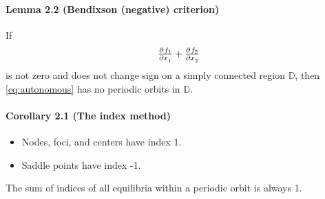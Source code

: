 \paragraph{Lemma 2.2 (Bendixson (negative) criterion)}
If
\begin{equation}
	\pd{f_1}{x_1} + \pd{f_2}{x_2}
\end{equation}
is not zero and does not change sign on a simply connected region $\mathbb{D}$, then \eqref{eq:autonomous} has no periodic orbits in $\mathbb{D}$.

\paragraph{Corollary 2.1 (The index method)}
\begin{itemize}
	\item Nodes, foci, and centers have index 1.
	\item Saddle points have index -1.
\end{itemize}
The sum of indices of all equilibria within a periodic orbit is always 1.